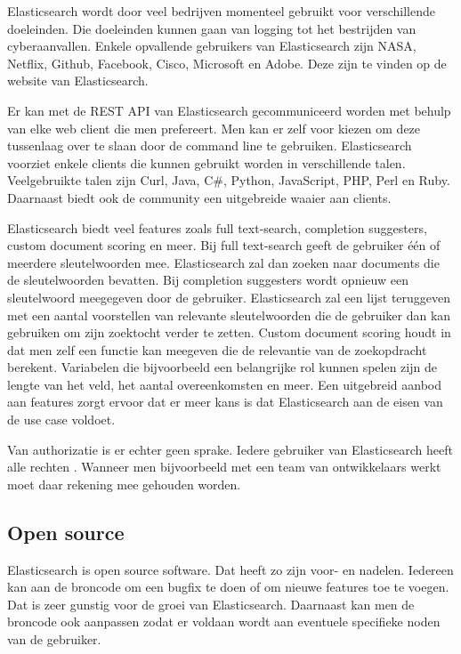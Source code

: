 Elasticsearch wordt door veel bedrijven momenteel gebruikt voor verschillende doeleinden. Die doeleinden kunnen gaan van logging tot het bestrijden van cyberaanvallen. Enkele opvallende gebruikers van Elasticsearch zijn NASA, Netflix, Github, Facebook, Cisco, Microsoft en Adobe. Deze zijn te vinden op de website van Elasticsearch.

Er kan met de REST API van Elasticsearch gecommuniceerd worden met behulp van elke web client die men prefereert. Men kan er zelf voor kiezen om deze tussenlaag over te slaan door de command line te gebruiken. Elasticsearch voorziet enkele clients die kunnen gebruikt worden in verschillende talen. Veelgebruikte talen zijn Curl, Java, C\#, Python, JavaScript, PHP, Perl en Ruby. Daarnaast biedt ook de community een uitgebreide waaier aan clients.

Elasticsearch biedt veel features zoals full text-search, completion suggesters, custom document scoring en meer. Bij full text-search geeft de gebruiker één of meerdere sleutelwoorden mee. Elasticsearch zal dan zoeken naar documents die de sleutelwoorden bevatten. Bij completion suggesters wordt opnieuw een sleutelwoord meegegeven door de gebruiker. Elasticsearch zal een lijst teruggeven met een aantal voorstellen van relevante sleutelwoorden die de gebruiker dan kan gebruiken om zijn zoektocht verder te zetten. Custom document scoring houdt in dat men zelf een functie kan meegeven die de relevantie van de zoekopdracht berekent. Variabelen die bijvoorbeeld een belangrijke rol kunnen spelen zijn de lengte van het veld, het aantal overeenkomsten en meer. Een uitgebreid aanbod aan features zorgt ervoor dat er meer kans is dat Elasticsearch aan de eisen van de use case voldoet. 

Van authorizatie is er echter geen sprake. Iedere gebruiker van Elasticsearch heeft alle rechten \autocite{Brasetvik2013}. Wanneer men bijvoorbeeld met een team van ontwikkelaars werkt moet daar rekening mee gehouden worden.

\subsection{Open source}

Elasticsearch is open source software. Dat heeft zo zijn voor- en nadelen. Iedereen kan aan de broncode om een bugfix te doen of om nieuwe features toe te voegen. Dat is zeer gunstig voor de groei van Elasticsearch. Daarnaast kan men de broncode ook aanpassen zodat er voldaan wordt aan eventuele specifieke noden van de gebruiker. \autocite{Tahir2008}

